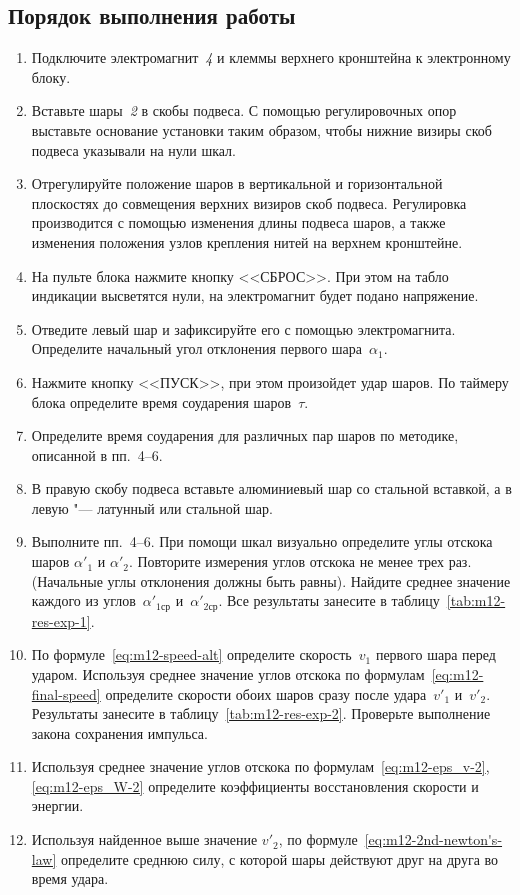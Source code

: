 \documentclass[a4paper, 12pt]{extarticle}
\begin{document}
\subsection{Порядок выполнения работы}
\begin{enumerate}
\item Подключите электромагнит~\emph{4} и клеммы верхнего кронштейна к электронному блоку.
\item Вставьте шары~\emph{2} в скобы подвеса. С помощью регулировочных опор выставьте основание установки таким образом, чтобы нижние визиры скоб подвеса указывали на нули шкал.
\item Отрегулируйте положение шаров в вертикальной и горизонтальной плоскостях до совмещения верхних визиров скоб подвеса. Регулировка производится с помощью изменения длины подвеса шаров, а также изменения положения узлов крепления нитей на верхнем кронштейне.
\item На пульте блока нажмите кнопку <<СБРОС>>. При этом на табло индикации высветятся нули, на электромагнит будет подано напряжение.
\item Отведите левый шар и зафиксируйте его с помощью электромагнита. Определите начальный угол отклонения первого шара~$\alpha_1$.
\item Нажмите кнопку <<ПУСК>>, при этом произойдет удар шаров. По таймеру блока определите время соударения шаров~$\tau$. 
\item Определите время соударения для различных пар шаров по методике, описанной в пп.~4--6. 
\item В правую скобу подвеса вставьте алюминиевый шар со стальной вставкой, а в левую "--- латунный или стальной шар.
\item Выполните пп.~4--6. При помощи шкал визуально определите углы отскока шаров $\alpha'_1$  и $\alpha'_2$. Повторите измерения углов отскока не менее  трех раз. (Начальные углы отклонения должны быть равны). Найдите среднее значение каждого из углов~$\alpha'_{1\text{ср}}$ и~$\alpha'_{2\text{ср}}$. Все результаты занесите в таблицу~\ref{tab:m12-res-exp-1}. 
\item По формуле~\eqref{eq:m12-speed-alt} определите скорость~$v_1$ первого шара перед ударом. Используя среднее значение углов отскока по формулам~\eqref{eq:m12-final-speed} определите скорости обоих шаров сразу после удара~$v'_1$  и~$v'_2$. Результаты занесите в таблицу~\ref{tab:m12-res-exp-2}. Проверьте выполнение закона сохранения импульса.
\item Используя среднее значение углов отскока по формулам~\eqref{eq:m12-eps_v-2}, \eqref{eq:m12-eps_W-2} определите коэффициенты восстановления скорости и энергии. 
\item Используя найденное выше значение $v'_2$, по формуле~\eqref{eq:m12-2nd-newton's-law} определите среднюю силу, с которой шары действуют друг на друга во время удара. 


\end{enumerate}
\end{document}
